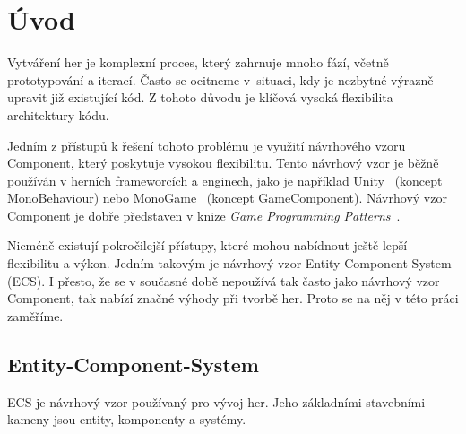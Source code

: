 \chapter{Úvod}
\label{chap:intro}
Vytváření her je komplexní proces, který zahrnuje mnoho fází, včetně prototypování a iterací. Často se ocitneme v~situaci, kdy je nezbytné výrazně upravit již existující kód. Z tohoto důvodu je klíčová vysoká flexibilita architektury kódu.

Jedním z přístupů k řešení tohoto problému je využití návrhového vzoru Component, který poskytuje vysokou flexibilitu. Tento návrhový vzor je běžně používán v herních frameworcích a enginech, jako je například Unity~\cite{Unity} (koncept MonoBehaviour) nebo MonoGame~\cite{MonoGame} (koncept GameComponent). Návrhový vzor Component je dobře představen v knize \textit{Game Programming Patterns}~\cite{nystrom2014game}.

Nicméně existují pokročilejší přístupy, které mohou nabídnout ještě lepší flexibilitu a výkon. Jedním takovým je návrhový vzor Entity-Component-System (ECS).  I přesto, že se v současné době nepoužívá tak často jako návrhový vzor Component, tak nabízí značné výhody při tvorbě her. Proto se na něj v této práci zaměříme.

\section{Entity-Component-System}
ECS je návrhový vzor používaný pro vývoj her. Jeho základními stavebními kameny jsou entity, komponenty a systémy.

